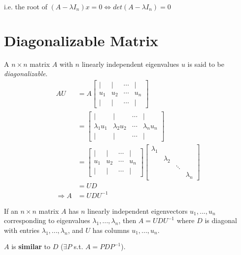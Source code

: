 \documentclass[11pt]{elegantbook}
\begin{document}
i.e. the root of $(A-\lambda I_n)x=0 \Leftrightarrow det(A-\lambda I_n)=0$





\section{Diagonalizable Matrix}
A $n\times n$ matrix $A$ with $n$ linearly independent eigenvalues $u$ is said to be \textit{diagonalizable}.
\begin{equation}
    \begin{aligned}
        AU&=A\begin{bmatrix}
            |&|&\cdots&|\\
            u_1&u_2&\cdots&u_n\\
            |&|&\cdots&|
        \end{bmatrix}\\
        &=\begin{bmatrix}
            |&|&\cdots&|\\
            \lambda_1u_1&\lambda_2u_2&\cdots&\lambda_nu_n\\
            |&|&\cdots&|
        \end{bmatrix}\\
        &=\begin{bmatrix}
            |&|&\cdots&|\\
            u_1&u_2&\cdots&u_n\\
            |&|&\cdots&|
        \end{bmatrix}\begin{bmatrix}
            \lambda_1&&&\\
            &\lambda_2&&\\
            &&\ddots&\\
            &&&\lambda_n
        \end{bmatrix}\\
        &=UD\\
        \Rightarrow	A&=UDU^{-1}
    \end{aligned}
    \nonumber
\end{equation}

\begin{theorem}
    If an $n\times n$ matrix $A$ has $n$ linearly independent eigenvectors $u_1,...,u_n$ corresponding to eigenvalues $\lambda_1,...,\lambda_n$, then $A = UDU^{-1}$ where $D$ is diagonal with entries $\lambda_1,...,\lambda_n$, and $U$ has columns $u_1,...,u_n$.
\end{theorem}
$A$ is \textbf{similar} to $D$ ($\exists P$ s.t. $A=PDP^{-1}$).
\end{document}
